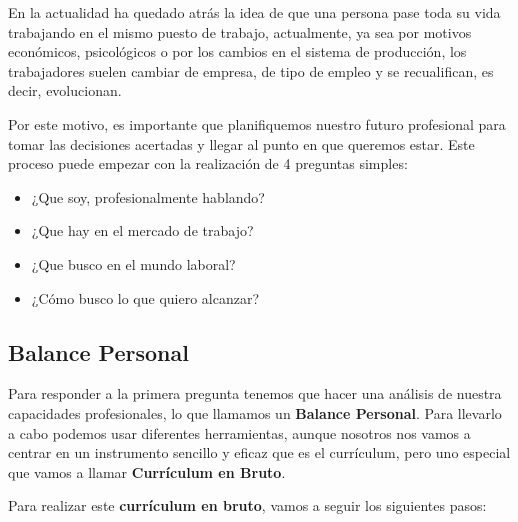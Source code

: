 En la actualidad ha quedado atrás la idea de que una persona pase toda su vida trabajando en el mismo puesto de trabajo, actualmente, ya sea por motivos económicos, psicológicos o por los cambios en el sistema de producción, los trabajadores suelen cambiar de empresa, de tipo de empleo y se recualifican, es decir, evolucionan.

Por este motivo, es importante que planifiquemos nuestro futuro profesional para tomar las decisiones acertadas y llegar al punto en que queremos estar. Este proceso puede empezar con la realización de 4 preguntas simples:

\begin{itemize}
    \item ¿Que soy, profesionalmente hablando?
    \item ¿Que hay en el mercado de trabajo?
    \item ¿Que busco en el mundo laboral?
    \item ¿Cómo busco lo que quiero alcanzar?
\end{itemize}

\subsection{Balance Personal}
Para responder a la primera pregunta tenemos que hacer una análisis de nuestra capacidades profesionales, lo que llamamos un \textbf{Balance Personal}. Para llevarlo a cabo podemos usar diferentes herramientas, aunque nosotros nos vamos a centrar en un instrumento sencillo y eficaz que es el currículum, pero uno especial que vamos a llamar \textbf{Currículum en Bruto}.

Para realizar este \textbf{currículum en bruto}, vamos a seguir los siguientes pasos:

